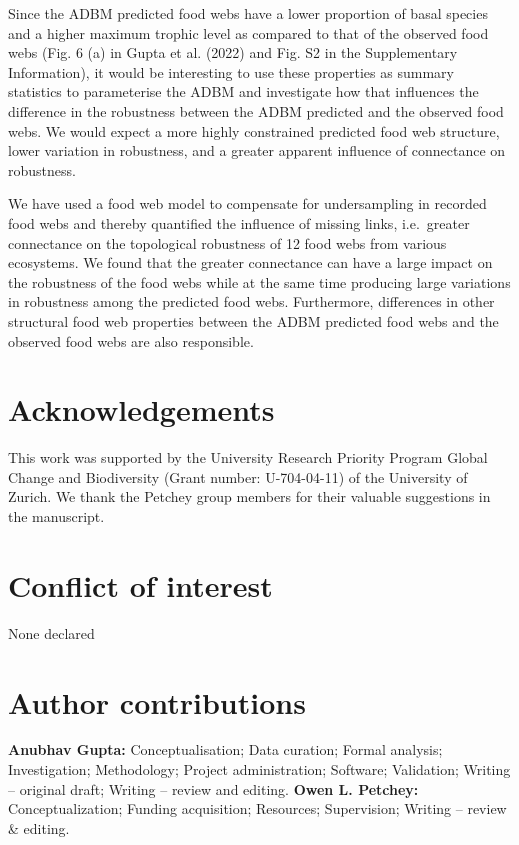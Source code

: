 \documentclass{article}
\begin{document}
Since the ADBM predicted food webs have a lower proportion of basal
species and a higher maximum trophic level as compared to that of the
observed food webs (Fig. 6 (a) in Gupta et al. (2022) and Fig. S2 in the
Supplementary Information), it would be interesting to use these
properties as summary statistics to parameterise the ADBM and
investigate how that influences the difference in the robustness between
the ADBM predicted and the observed food webs. We would expect a more
highly constrained predicted food web structure, lower variation in
robustness, and a greater apparent influence of connectance on
robustness.

We have used a food web model to compensate for undersampling in
recorded food webs and thereby quantified the influence of missing
links, i.e.~greater connectance on the topological robustness of 12 food
webs from various ecosystems. We found that the greater connectance can
have a large impact on the robustness of the food webs while at the same
time producing large variations in robustness among the predicted food
webs. Furthermore, differences in other structural food web properties
between the ADBM predicted food webs and the observed food webs are also
responsible.

\hypertarget{acknowledgements}{%
\section{Acknowledgements}\label{acknowledgements}}

This work was supported by the University Research Priority Program
Global Change and Biodiversity (Grant number: U-704-04-11) of the
University of Zurich. We thank the Petchey group members for their
valuable suggestions in the manuscript.

\hypertarget{conflict-of-interest}{%
\section{Conflict of interest}\label{conflict-of-interest}}

None declared

\hypertarget{author-contributions}{%
\section{Author contributions}\label{author-contributions}}

\textbf{Anubhav Gupta:} Conceptualisation; Data curation; Formal
analysis; Investigation; Methodology; Project administration; Software;
Validation; Writing -- original draft; Writing -- review and editing.
\textbf{Owen L. Petchey:} Conceptualization; Funding acquisition;
Resources; Supervision; Writing -- review \& editing.
\end{document}
